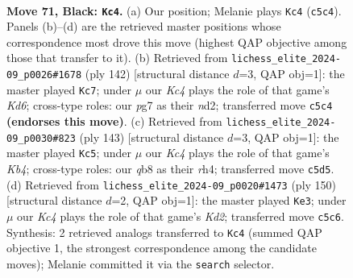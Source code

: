 \documentclass[11pt]{article}
\begin{document}
\clearpage

\begin{figure}[p]\centering
\begin{subfigure}{0.46\textwidth}\centering
\resizebox{\linewidth}{!}{%
\newchessgame
\chessboard[
  setfen={1Q6/6P1/4P3/2k4P/8/8/2K5/8 b - - 0 71},
  showmover=false,
  pgfstyle=straightmove, color=movearrow, markmove={c5-c4}
]}
\caption{}
\end{subfigure}\hfill
\begin{subfigure}{0.46\textwidth}\centering
\resizebox{\linewidth}{!}{%
\newchessgame
\chessboard[
  setfen={8/p7/3K4/1q6/3k3p/8/3n4/8 w - - 4 72},
  showmover=false,
  pgfstyle=straightmove, color=movearrow, markmove={d6-c7}
]}
\caption{}
\end{subfigure}
\\[4pt]
\begin{subfigure}{0.46\textwidth}\centering
\resizebox{\linewidth}{!}{%
\newchessgame
\chessboard[
  setfen={8/5P2/8/1k1P2P1/7R/3K4/8/8 b - - 0 72},
  showmover=false,
  pgfstyle=straightmove, color=movearrow, markmove={b5-c5}
]}
\caption{}
\end{subfigure}\hfill
\begin{subfigure}{0.46\textwidth}\centering
\resizebox{\linewidth}{!}{%
\newchessgame
\chessboard[
  setfen={8/p4p2/8/8/8/k7/3K4/1q6 w - - 0 76},
  showmover=false,
  pgfstyle=straightmove, color=movearrow, markmove={d2-e3}
]}
\caption{}
\end{subfigure}
\caption{\textbf{Move 71, Black: \texttt{Kc4}.} (a) Our position; Melanie plays \texttt{Kc4} (\texttt{c5c4}). Panels (b)--(d) are the retrieved master positions whose correspondence most drove this move (highest QAP objective among those that transfer to it). (b) Retrieved from \texttt{lichess\_elite\_2024-09\_p0026\#1678} (ply 142) [structural distance $d$=3, QAP obj=1]: the master played \texttt{Kc7}; under $\mu$ our \emph{Kc4} plays the role of that game's \emph{Kd6}; cross-type roles: our \emph{p}g7 as their \emph{n}d2; transferred move \texttt{c5c4} \textbf{(endorses this move)}. (c) Retrieved from \texttt{lichess\_elite\_2024-09\_p0030\#823} (ply 143) [structural distance $d$=3, QAP obj=1]: the master played \texttt{Kc5}; under $\mu$ our \emph{Kc4} plays the role of that game's \emph{Kb4}; cross-type roles: our \emph{q}b8 as their \emph{r}h4; transferred move \texttt{c5d5}. (d) Retrieved from \texttt{lichess\_elite\_2024-09\_p0020\#1473} (ply 150) [structural distance $d$=2, QAP obj=1]: the master played \texttt{Ke3}; under $\mu$ our \emph{Kc4} plays the role of that game's \emph{Kd2}; transferred move \texttt{c5c6}. Synthesis: 2 retrieved analogs transferred to \texttt{Kc4} (summed QAP objective 1, the strongest correspondence among the candidate moves); Melanie committed it via the \texttt{search} selector.}
\label{fig:thought-m141}
\end{figure}
\end{document}
